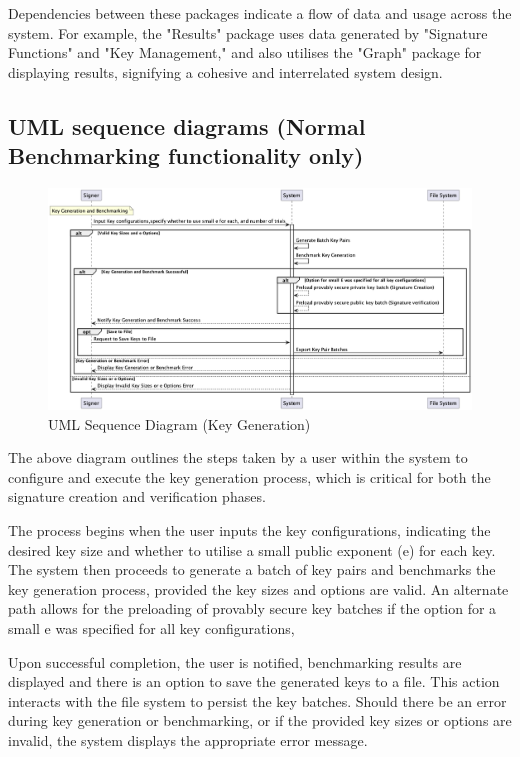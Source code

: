 \documentclass[]{final_report}
\theoremstyle{definition}
\begin{document}
Dependencies between these packages indicate a flow of data and usage across the system. For example, the "Results" package uses data generated by "Signature Functions" and "Key Management," and also utilises the "Graph" package for displaying results, signifying a cohesive and interrelated system design.


\subsection{UML sequence diagrams (Normal Benchmarking functionality only)}
\begin{figure}[H]
    \centering
    \includegraphics[scale=0.42]{main_pictures/sequenceKey.png}
    \caption{UML Sequence Diagram (Key Generation)}
    \label{fig:uc}
\end{figure}

The above diagram outlines the steps taken by a user within the system to configure and execute the key generation process, which is critical for both the signature creation and verification phases.

The process begins when the user inputs the key configurations, indicating the desired key size and whether to utilise a small public exponent (e) for each key. The system then proceeds to generate a batch of key pairs and benchmarks the key generation process, provided the key sizes and options are valid. An alternate path allows for the preloading of provably secure key batches if the option for a small e was specified for all key configurations,

Upon successful completion, the user is notified, benchmarking results are displayed and there is an option to save the generated keys to a file. This action interacts with the file system to persist the key batches. Should there be an error during key generation or benchmarking, or if the provided key sizes or options are invalid, the system displays the appropriate error message.
\end{document}
